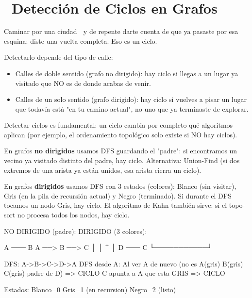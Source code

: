 \chapter[\emj{🔁}~Detección de Ciclos en Grafos]{~Detección de Ciclos en Grafos}

\begin{dsaquees}

Caminar por una ciudad 🚶 y de repente darte cuenta de que ya pasaste
por esa esquina: diste una vuelta completa. Eso es un ciclo.

Detectarlo depende del tipo de calle:
\begin{itemize}
\item Calles de doble sentido (grafo no dirigido): hay ciclo si llegas
      a un lugar ya visitado que NO es de donde acabas de venir.
\item Calles de un solo sentido (grafo dirigido): hay ciclo si vuelves
      a pisar un lugar que todavía está "en tu camino actual", no uno
      que ya terminaste de explorar.
\end{itemize}

\end{dsaquees}

\begin{dsaotraforma}

Detectar ciclos es fundamental: un ciclo cambia por completo qué
algoritmos aplican (por ejemplo, el ordenamiento topológico solo existe
si NO hay ciclos).

En grafos \textbf{no dirigidos} usamos DFS guardando el "padre": si
encontramos un vecino ya visitado distinto del padre, hay ciclo.
Alternativa: Union-Find (si dos extremos de una arista ya están unidos,
esa arista cierra un ciclo).

En grafos \textbf{dirigidos} usamos DFS con 3 estados (colores):
Blanco (sin visitar), Gris (en la pila de recursión actual) y Negro
(terminado). Si durante el DFS tocamos un nodo Gris, hay ciclo. El
algoritmo de Kahn también sirve: si el topo-sort no procesa todos los
nodos, hay ciclo.

\end{dsaotraforma}

\begin{dsadiagrama}
NO DIRIGIDO (padre):        DIRIGIDO (3 colores):

  A ─── B                     A ──> B ──> C
  │     │                     ^           │
  D ─── C                     └───────────┘

DFS: A->B->C->D->A            DFS desde A:
Al ver A de nuevo (no es      A(gris) B(gris) C(gris)
padre de D) => CICLO          C apunta a A que esta GRIS
                              => CICLO

Estados: Blanco=0  Gris=1 (en recursion)  Negro=2 (listo)
\end{dsadiagrama}

